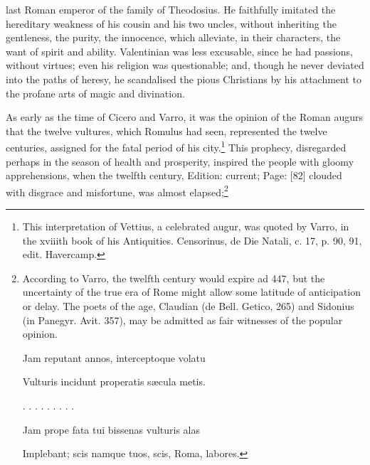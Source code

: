 last Roman emperor of the family of Theodosius. He faithfully imitated the hereditary weakness of his cousin and his two uncles, without inheriting the gentleness, the purity, the innocence, which alleviate, in their characters, the want of spirit and ability. Valentinian was less excusable, since he had passions, without virtues; even his religion was questionable; and, though he never deviated into the paths of heresy, he scandalised the pious Christians by his attachment to the profane arts of magic and divination.

As early as the time of Cicero and Varro, it was the opinion of the Roman augurs that the twelve vultures, which Romulus had seen, represented the twelve centuries, assigned for the fatal period of his city.\footnote{This interpretation of Vettius, a celebrated augur, was quoted by Varro, in the xviiith book of his Antiquities. Censorinus, de Die Natali, c. 17, p. 90, 91, edit. Havercamp.} This prophecy, disregarded perhaps in the season of health and prosperity, inspired the people with gloomy apprehensions, when the twelfth century, Edition: current; Page: [82] clouded with disgrace and misfortune, was almost elapsed;\footnote{According to Varro, the twelfth century would expire ad 447, but the uncertainty of the true era of Rome might allow some latitude of anticipation or delay. The poets of the age, Claudian (de Bell. Getico, 265) and Sidonius (in Panegyr. Avit. 357), may be admitted as fair witnesses of the popular opinion.

Jam reputant annos, interceptoque volatu

Vulturis incidunt properatis sæcula metis.

. . . . . . . . .

Jam prope fata tui bissenas vulturis alas

Implebant; scis namque tuos, scis, Roma, labores.

}
